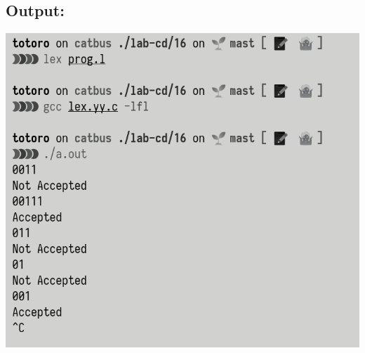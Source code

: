 \documentclass{article}
\begin{document}
\subsection*{Output:}
\begin{center}
  \includegraphics[width=14cm]{16/out.png}
\end{center}
\end{document}
